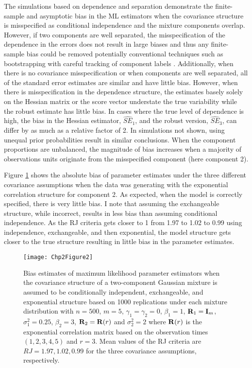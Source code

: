 The simulations based on dependence and separation demonstrate the finite-sample and asymptotic bias in the ML estimators when the covariance structure is misspecified as conditional independence and the mixture components overlap. However, if two components are well separated, the misspecification of the dependence in the errors does not result in large biases and thus any finite-sample bias could be removed potentially conventional techniques such as bootstrapping with careful tracking of component labels \cite{grun2004}. Additionally, when there is no covariance misspecification or when components are well separated, all of the standard error estimates are similar and have little bias. However, when there is misspecification in the dependence structure, the estimates basely solely on the Hessian matrix or the score vector understate the true variability while the robust estimate has little bias. In cases where the true level of dependence is high, the bias in the Hessian estimator, $\widehat{SE}_{1}$, and the robust version, $\widehat{SE}_{3}$, can differ by as much as a relative factor of 2. In simulations not shown, using unequal prior probabilities result in similar conclusions. When the component proportions are unbalanced, the magnitude of bias increases when a majority of observations units originate from the misspecified component (here component 2). 

Figure \ref{fig:2-2} shows the absolute bias of parameter estimates under the three different covariance assumptions when the data was generating with the exponential correlation structure for component 2. As expected, when the model is correctly specified, there is very little bias. I note that assuming the exchangeable structure, while incorrect, results in less bias than assuming conditional independence. As the RJ criteria gets closer to 1 from 1.97 to 1.02 to 0.99 using independence, exchangeable, and then exponential, the model structure gets closer to the true structure resulting in little bias in the parameter estimates.
\begin{figure}
\begin{center}
\texttt{[image: Chp2Figure2]}
\end{center}
\caption{Bias estimates of maximum likelihood parameter estimators when the covariance structure of a two-component Gaussian mixture is assumed to be conditionally independent, exchangeable, and exponential structure based on 1000 replications under each mixture distribution with $n=500$, $m=5$, $\gamma_1=\gamma_2=0$, $\beta_{1}=1$, $\mathbf R_1=\mathbf I_{m}$, $\sigma_1^{2}=0.25$, $\beta_2=3$, $\mathbf R_2=\mathbf R(r)$ and $\sigma_2^{2}=2$ where $\mathbf R(r)$ is the exponential correlation matrix based on the observation times $(1,2,3,4,5)$ and $r=3$. Mean values of the RJ criteria are $RJ = 1.97, 1.02, 0.99$ for the three covariance assumptions, respectively.}
\label{fig:2-2}
\end{figure}

